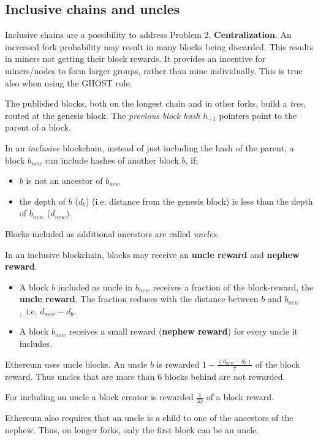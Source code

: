 \subsection{Inclusive chains and uncles}
Inclusive chains are a possibility to address Problem 2, \textbf{Centralization}.
An increased fork probability may result in many blocks being discarded. This results in miners not getting their block rewards. It provides an incentive for miners/nodes to form larger groups, rather than mine individually. 
This is true also when using the GHOST rule.

\begin{definition} The published blocks, both on the longest chain and in other forks, build a \emph{tree}, routed at the genesis block.
The \emph{previous block hash} $h_{-1}$ pointers point to the parent of a block.
\end{definition}
\begin{definition}
	In an \emph{inclusive} blockchain, instead of just including the hash of the parent, a block $b_{new}$ can include hashes of another block $b$, if:
	\begin{itemize}
		\item $b$ is not an ancestor of $b_{new}$
		\item the depth of $b$ ($d_b$) (i.e. distance from the genesis block) is less than the depth of $b_{new}$ ($d_{new}$).
	\end{itemize}
	Blocks included as additional ancestors are called \emph{uncles.}
\end{definition}

\begin{definition}
In an inclusive blockchain, blocks may receive an \textbf{uncle reward} and \textbf{nephew reward}.
	\begin{itemize}
		\item A block $b$ included as uncle in $b_{new}$ receives a fraction of the block-reward, the \textbf{uncle reward}. The fraction reduces with the distance between $b$ and $b_{new}$,~i.e. $d_{new}-d_{b}$.
		\item A block $b_{new}$ receives a small reward (\textbf{nephew reward}) for every uncle it includes.
	\end{itemize}
\end{definition}

\begin{example}
Ethereum uses uncle blocks. An uncle $b$ is rewarded $1-\frac{(d_{new}-d_b)}{7}$ of the block reward. Thus uncles that are more than 6 blocks behind are not rewarded.

For including an uncle a block creator is rewarded $\frac{1}{32}$ of a block reward.

Ethereum also requires that an uncle  is a child to one of the ancestors of the nephew. Thus, on longer forks, only the first block can be an uncle.
\end{example}

